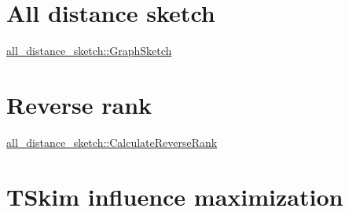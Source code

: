 \hypertarget{Overview_ADS}{}\section{All distance sketch}\label{Overview_ADS}
\hyperlink{classall__distance__sketch_1_1GraphSketch}{all\+\_\+distance\+\_\+sketch\+::\+Graph\+Sketch}\hypertarget{Overview_RRank}{}\section{Reverse rank}\label{Overview_RRank}
\hyperlink{namespaceall__distance__sketch_a025f777de5a9df1594dd306f9037f385}{all\+\_\+distance\+\_\+sketch\+::\+Calculate\+Reverse\+Rank}\hypertarget{Overview_TSkim}{}\section{T\+Skim influence maximization}\label{Overview_TSkim}
